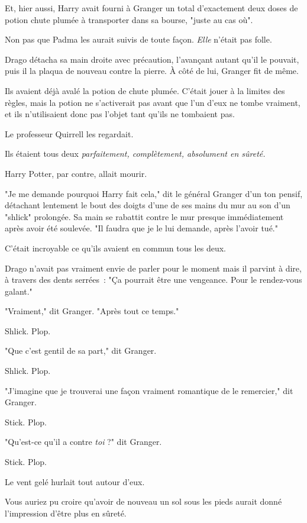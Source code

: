 Et, hier aussi, Harry avait fourni à Granger un total d'exactement deux doses de potion chute plumée à transporter dans sa bourse, "juste au cas où".

Non pas que Padma les aurait suivis de toute façon. \emph{Elle} n'était pas folle.

Drago détacha sa main droite avec précaution, l'avançant autant qu'il le pouvait, puis il la plaqua de nouveau contre la pierre. À côté de lui, Granger fit de même.

Ils avaient déjà avalé la potion de chute plumée. C'était jouer à la limites des règles, mais la potion ne s'activerait pas avant que l'un d'eux ne tombe vraiment, et ils n'utilisaient donc pas l'objet tant qu'ils ne tombaient pas.

Le professeur Quirrell les regardait.

Ils étaient tous deux \emph{parfaitement, complètement, absolument en sûreté.}

Harry Potter, par contre, allait mourir.

"Je me demande pourquoi Harry fait cela," dit le général Granger d'un ton pensif, détachant lentement le bout des doigts d'une de ses mains du mur au son d'un "shlick" prolongée. Sa main se rabattit contre le mur presque immédiatement après avoir été soulevée. "Il faudra que je le lui demande, après l'avoir tué."

C'était incroyable ce qu'ils avaient en commun tous les deux.

Drago n'avait pas vraiment envie de parler pour le moment mais il parvint à dire, à travers des dents serrées~: "Ça pourrait être une vengeance. Pour le rendez-vous galant."

"Vraiment," dit Granger. "Après tout ce temps."

Shlick. Plop.

"Que c'est gentil de sa part," dit Granger.

Shlick. Plop.

"J'imagine que je trouverai une façon vraiment romantique de le remercier," dit Granger.

Stick. Plop.

"Qu'est-ce qu'il a contre \emph{toi} ?" dit Granger.

Stick. Plop.

Le vent gelé hurlait tout autour d'eux.

\later

Vous auriez pu croire qu'avoir de nouveau un sol sous les pieds aurait donné l'impression d'être plus en sûreté.


